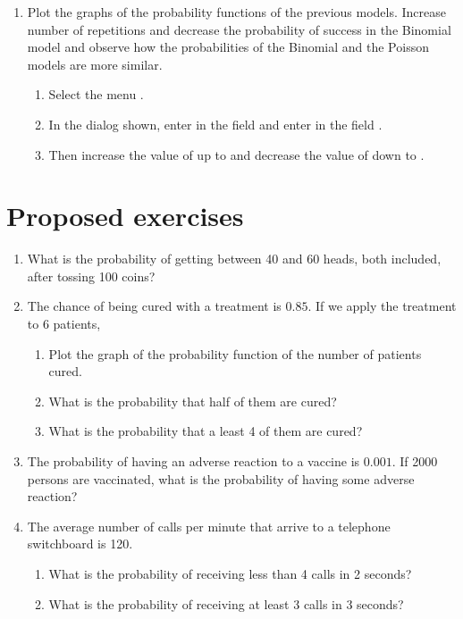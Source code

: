 \begin{enumerate}[leftmargin=*]
\begin{enumerate}
\item Plot the graphs of the probability functions of the previous models. 
Increase number of repetitions and decrease the probability of success in the Binomial model and observe how the probabilities of the Binomial and the Poisson models are more similar.   
\begin{indication}
\begin{enumerate}
\item Select the menu .
\item In the dialog shown, enter  in the field  and enter  in the field .
\item Then increase the value of  up to  and decrease the value of  down to .
\end{enumerate}
\end{indication}
\end{enumerate}
\end{enumerate}


\section{Proposed exercises}
\begin{enumerate}[leftmargin=*]
\item What is the probability of getting between 40 and 60 heads, both included, after tossing 100 coins?

\item The chance of being cured with a treatment is $0.85$. 
If we apply the treatment to 6 patients,
\begin{enumerate}
\item Plot the graph of the probability function of the number of patients cured.  
\item What is the probability that half of them are cured?
\item What is the probability that a least 4 of them are cured?
\end{enumerate}

\item The probability of having an adverse reaction to a vaccine is $0.001$. 
If 2000 persons are vaccinated, what is the probability of having some adverse reaction?

\item The average number of calls per minute that arrive to a telephone switchboard is 120. 
\begin{enumerate}
\item What is the probability of receiving less than 4 calls in 2 seconds?
\item What is the probability of receiving at least 3 calls in 3 seconds?
\end{enumerate}
\end{enumerate}







